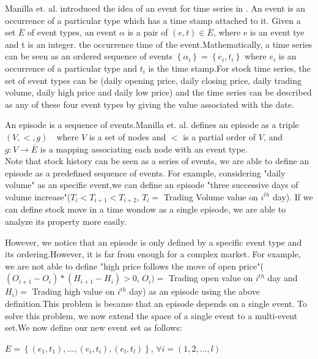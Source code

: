 \documentclass[10pt, conference, compsocconf]{IEEEtran}
\begin{document}
Manilla et. al. introduced the idea of an event for time series in \cite{algorithm}. An event is an occurrence of a particular type which has a time stamp attached to it. Given a set $\overline{E}$ of event types, an event $\alpha$ is a pair of $\left ( e,t \right )\in \overline{E}$, where e is an event tye and t is an integer. the occurrence time of the event.Mathematically, a time series can be seen as an ordered sequence of events $\left \{ \alpha_{i}  \right \}=\left \{ e_{i},t_{i} \right \}$ where $e_{i}$ is an occurrence of a particular type and $t_{i}$ is the time stamp.For stock time series, the set of event types can be (daily opening price, daily closing price, daily trading volume, daily high price and daily low price) and the time series can be described as any of these four event types by giving the value associated with the date. \\
\par 
An episode is a sequence of events.Manilla et. al. defines an episode as a triple $\left (V,< ,g  \right )$　where $V$ is a set of nodes and $<$ is a partial order of $V$, and $g:V\rightarrow \overline{E}$ is a mapping associating each node with an event type.\\
Note that stock history can be seen as a series of events, we are able to define an episode as a predefined sequence of events. For example, considering "daily volume" as an specific event,we can define an episode "three successive days of volume increase"($T_{i}<T_{i+1}<T_{i+2}$, $T_{i}=$ Trading Volume value on $i^{th}$ day). If we can define stock move in a time wondow as a single episode, we are able to analyze its property more easily.
\par
However, we notice that an episode is only defined by a specific event type and its ordering.However, it is far from enough for a complex market. For example, we are not able to define "high price follows the move of open price"($(O_{i+1}-O_{i})*(H_{i+1}-H_{i})>0$, $O_{i})=$ Trading open value on $i^{th}$ day and $H_{i})=$ Trading high value on $i^{th}$ day) as an episode using the above definition.This problem is because that an episode depends on a single event. To solve this problem, we now extend the space of a single event to a multi-event set.We now define our new event set as follows:
\par
$E=\left \{ (e_{1},t_{1}),...,(e_{i},t_{i}),(e_{l},t_{l}) \right \}$, $\forall i=(1,2,...,l)$
\par
\end{document}
